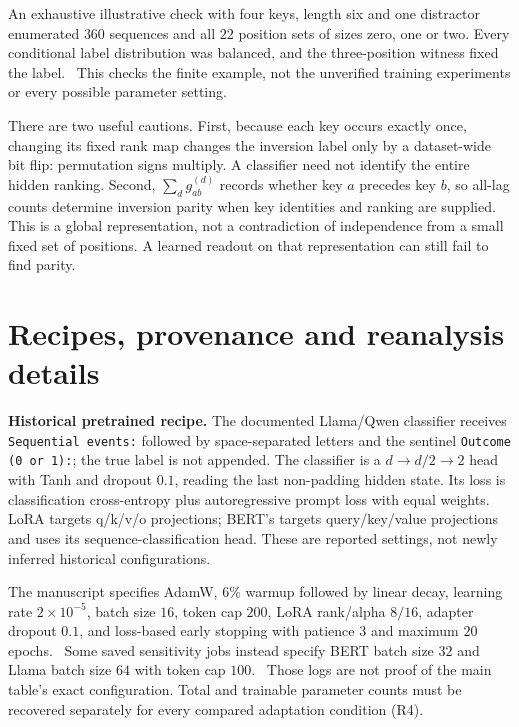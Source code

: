 An exhaustive illustrative check with four keys, length six and one distractor enumerated $360$ sequences and all $22$ position sets of sizes zero, one or two. Every conditional label distribution was balanced, and the three-position witness fixed the label. \newres\ This checks the finite example, not the unverified training experiments or every possible parameter setting.

There are two useful cautions. First, because each key occurs exactly once, changing its fixed rank map changes the inversion label only by a dataset-wide bit flip: permutation signs multiply. A classifier need not identify the entire hidden ranking. Second, $\sum_d g_{ab}^{(d)}$ records whether key $a$ precedes key $b$, so all-lag counts determine inversion parity when key identities and ranking are supplied. This is a global representation, not a contradiction of independence from a small fixed set of positions. A learned readout on that representation can still fail to find parity.

\section{Recipes, provenance and reanalysis details}
\label{app:recipes}
\textbf{Historical pretrained recipe.} The documented Llama/Qwen classifier receives \texttt{Sequential events:} followed by space-separated letters and the sentinel \texttt{Outcome (0 or 1):}; the true label is not appended. The classifier is a $d\to d/2\to2$ head with Tanh and dropout $0.1$, reading the last non-padding hidden state. Its loss is classification cross-entropy plus autoregressive prompt loss with equal weights. LoRA targets q/k/v/o projections; BERT's targets query/key/value projections and uses its sequence-classification head. These are reported settings, not newly inferred historical configurations. \ou

The manuscript specifies AdamW, $6\%$ warmup followed by linear decay, learning rate $2\times10^{-5}$, batch size $16$, token cap $200$, LoRA rank/alpha $8/16$, adapter dropout $0.1$, and loss-based early stopping with patience $3$ and maximum $20$ epochs. \ou\ Some saved sensitivity jobs instead specify BERT batch size $32$ and Llama batch size $64$ with token cap $100$. \orig\ Those logs are not proof of the main table's exact configuration. Total and trainable parameter counts must be recovered separately for every compared adaptation condition (R4).

